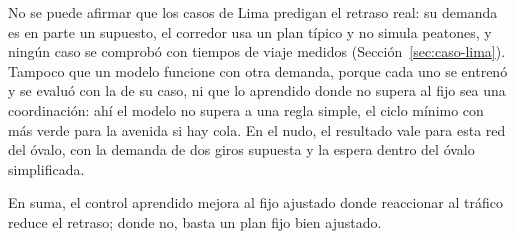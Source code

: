 No se puede afirmar que los casos de Lima predigan el retraso real: su
demanda es en parte un supuesto, el corredor usa un plan típico y no
simula peatones, y ningún caso se comprobó con tiempos de viaje medidos
(Sección~\ref{sec:caso-lima}). Tampoco que un modelo funcione con otra
demanda, porque cada uno se entrenó y se evaluó con la de su caso, ni
que lo aprendido donde no supera al fijo sea una coordinación: ahí el
modelo no supera a una regla simple, el ciclo mínimo con más verde para
la avenida si hay cola. En el nudo, el resultado vale para esta red del
óvalo, con la demanda de dos giros supuesta y la espera dentro del óvalo
simplificada.

En suma, el control aprendido mejora al fijo ajustado donde reaccionar
al tráfico reduce el retraso; donde no, basta un plan fijo bien
ajustado.
